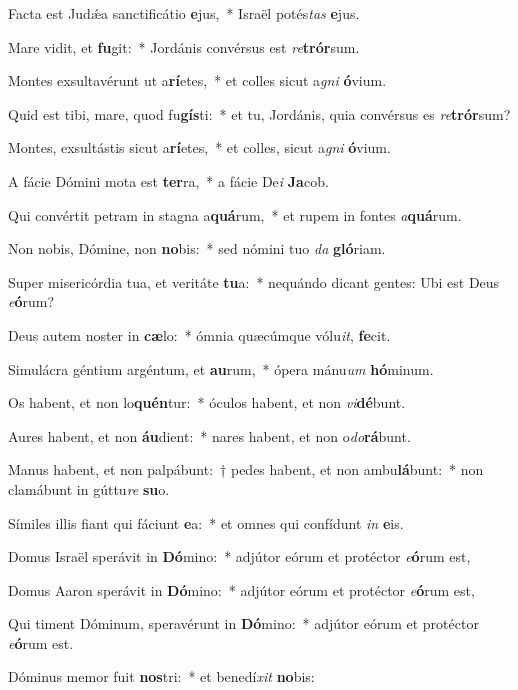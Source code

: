 \item Facta est Judǽa sanctificátio \textbf{e}jus,~* Israël potés\textit{tas} \textbf{e}jus.
\item Mare vidit, et \textbf{fu}git:~* Jordánis convérsus est \textit{re}\textbf{trór}sum.
\item Montes exsultavérunt ut a\textbf{rí}etes,~* et colles sicut a\textit{gni} \textbf{ó}vium.
\item Quid est tibi, mare, quod fu\textbf{gís}ti:~* et tu, Jordánis, quia convérsus es \textit{re}\textbf{trór}sum?
\item Montes, exsultástis sicut a\textbf{rí}etes,~* et colles, sicut a\textit{gni} \textbf{ó}vium.
\item A fácie Dómini mota est \textbf{ter}ra,~* a fácie De\textit{i} \textbf{Ja}cob.
\item Qui convértit petram in stagna a\textbf{quá}rum,~* et rupem in fontes \textit{a}\textbf{quá}rum.
\item Non nobis, Dómine, non \textbf{no}bis:~* sed nómini tuo \textit{da} \textbf{gló}riam.
\item Super misericórdia tua, et veritáte \textbf{tu}a:~* nequándo dicant gentes: Ubi est Deus \textit{e}\textbf{ó}rum?
\item Deus autem noster in \textbf{cæ}lo:~* ómnia quæcúmque vólu\textit{it}, \textbf{fe}cit.
\item Simulácra géntium argéntum, et \textbf{au}rum,~* ópera mánu\textit{um} \textbf{hó}minum.
\item Os habent, et non lo\textbf{quén}tur:~* óculos habent, et non \textit{vi}\textbf{dé}bunt.
\item Aures habent, et non \textbf{áu}dient:~* nares habent, et non o\textit{do}\textbf{rá}bunt.
\item Manus habent, et non palpábunt:~† pedes habent, et non ambu\textbf{lá}bunt:~* non clamábunt in gúttu\textit{re} \textbf{su}o.
\item Símiles illis fiant qui fáciunt \textbf{e}a:~* et omnes qui confídunt \textit{in} \textbf{e}is.
\item Domus Israël sperávit in \textbf{Dó}mino:~* adjútor eórum et protéctor \textit{e}\textbf{ó}rum est,
\item Domus Aaron sperávit in \textbf{Dó}mino:~* adjútor eórum et protéctor \textit{e}\textbf{ó}rum est,
\item Qui timent Dóminum, speravérunt in \textbf{Dó}mino:~* adjútor eórum et protéctor \textit{e}\textbf{ó}rum est.
\item Dóminus memor fuit \textbf{nos}tri:~* et benedí\textit{xit} \textbf{no}bis:
